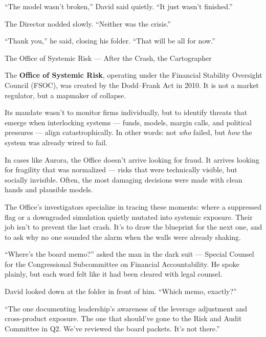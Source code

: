 ``The model wasn’t broken,'' David said quietly. ``It just wasn’t finished.''

The Director nodded slowly. ``Neither was the crisis.''

``Thank you,'' he said, closing his folder. ``That will be all for now.''

\medskip

\begin{HistoricalSidebar}{The Office of Systemic Risk --- After the Crash, the Cartographer}

  The \textbf{Office of Systemic Risk}, operating under the Financial Stability Oversight Council (FSOC), 
  was created by the Dodd–Frank Act in 2010. It is not a market regulator, but a mapmaker of collapse.

  \medskip
  
  Its mandate wasn’t to monitor firms individually, but to identify threats that emerge when interlocking 
  systems --- funds, models, margin calls, and political pressures --- align catastrophically. In other words: 
  not \textit{who} failed, but \textit{how} the system was already wired to fail.

  \medskip
  
  In cases like Aurora, the Office doesn’t arrive looking for fraud. It arrives looking for fragility that 
  was normalized — risks that were technically visible, but socially invisible. Often, the most damaging 
  decisions were made with clean hands and plausible models.

  \medskip
  
  The Office’s investigators specialize in tracing these moments: where a suppressed flag or a downgraded 
  simulation quietly mutated into systemic exposure. Their job isn’t to prevent the last crash. It’s to 
  draw the blueprint for the next one, and to ask why no one sounded the alarm when the walls were 
  already shaking.
  
\end{HistoricalSidebar}

\medskip


``Where’s the board memo?'' asked the man in the dark suit — Special Counsel for the Congressional Subcommittee 
on Financial Accountability. He spoke plainly, but each word felt like it had been cleared with legal counsel.

David looked down at the folder in front of him. ``Which memo, exactly?''

``The one documenting leadership’s awareness of the leverage adjustment and cross-product exposure. The one that 
should’ve gone to the Risk and Audit Committee in Q2. We’ve reviewed the board packets. It’s not there.''

